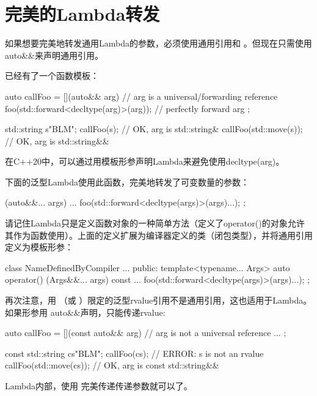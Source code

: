 \section{完美的Lambda转发}
如果想要完美地转发通用Lambda的参数，必须使用通用引用和 。但现在只需使用auto\&\&来声明通用引用。

已经有了一个函数模板：

\begin{cppcode}
auto callFoo = [](auto&& arg) { // arg is a universal/forwarding reference
	foo(std::forward<decltype(arg)>(arg)); // perfectly forward arg
};

std::string s{"BLM"};
callFoo(s); // OK, arg is std::string&
callFoo(std::move(s)); // OK, arg is std::string&&
\end{cppcode}

在C++20中，可以通过用模板形参声明Lambda来避免使用decltype(arg)。

下面的泛型Lambda使用此函数，完美地转发了可变数量的参数：

\begin{cppcode}
[] (auto&&... args) {
	...
	foo(std::forward<decltype(args)>(args)...);
};
\end{cppcode}

请记住Lambda只是定义函数对象的一种简单方法（定义了operator()的对象允许其作为函数使用）。上面的定义扩展为编译器定义的类（闭包类型），并将通用引用定义为模板形参：

\begin{cppcode}
class NameDefinedByCompiler {
	...
	public:
	template<typename... Args>
	auto operator() (Args&&... args) const {
		...
		foo(std::forward<decltype(args)>(args)...);
	}
};
\end{cppcode}

再次注意，用 （或 ）限定的泛型rvalue引用不是通用引用，这也适用于Lambda。如果形参用  auto\&\&声明，只能传递rvalue:

\begin{cppcode}
auto callFoo = [](const auto&& arg) { // arg is not a universal reference
	...
};

const std::string cs{"BLM"};
callFoo(cs); // ERROR: s is not an rvalue
callFoo(std::move(cs)); // OK, arg is const std::string&&
\end{cppcode}

Lambda内部，使用  完美传递传递参数就可以了。
















































